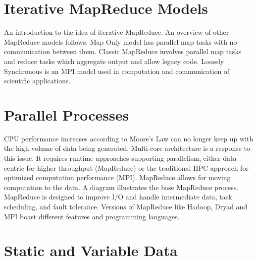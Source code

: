 
\section{Iterative MapReduce Models}

An introduction to the idea of iterative MapReduce. An overview of other
MapReduce models follows. Map Only model has parallel map tasks with no
communication between them. Classic MapReduce involves parallel map
tasks and reduce tasks which aggregate output and allow legacy code.
Loosely Synchronous is an MPI model used in computation and
communication of scientific applications.



\section{Parallel Processes}

CPU performance increases according to Moore's Law can no longer keep up
with the high volume of data being generated. Multi-core architecture is
a response to this issue. It requires runtime approaches supporting
parallelism, either data-centric for higher throughput (MapReduce) or
the traditional HPC approach for optimized computation performance
(MPI). MapReduce allows for moving computation to the data. A diagram
illustrates the base MapReduce process. MapReduce is designed to improve
I/O and handle intermediate data, task scheduling, and fault tolerance.
Versions of MapReduce like Hadoop, Dryad and MPI boast different
features and programming languages.



\section{Static and Variable Data}

